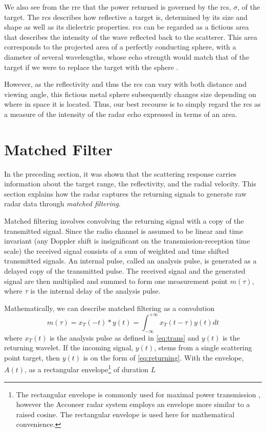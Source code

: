 We also see from the \gls{rre} that the power returned is governed by the \gls{rcs}, $\sigma$, of the target. The \gls{rcs} describes how reflective a target is, determined by its size and shape as well as its dielectric properties. \gls{rcs} can be regarded as a fictious area that describes the intensity of the wave reflected back to the scatterer. This area corresponds to the projected area of a perfectly conducting sphere, with a diameter of several wavelengths, whose echo strength would match that of the target if we were to replace the target with the sphere \citep{knott_1993}. 

However, as the reflectivity and thus the \gls{rcs} can vary with both distance and viewing angle, this fictious metal sphere subsequently changes size depending on where in space it is located. Thus, our best recourse is to simply regard the \gls{rcs} as a measure of the intensity of the radar echo expressed in terms of an area. 

\section{Matched Filter}\label{sec:mf}

In the preceding section, it was shown that the scattering response carries information about the target range, the reflectivity, and the radial velocity. This section explains how the radar captures the returning signals to generate raw radar data through \emph{matched filtering}.

Matched filtering involves convolving the returning signal with a copy of the transmitted signal. Since the radio channel is assumed to be linear and time invariant (any Doppler shift is insignificant on the transmission-reception time scale) the received signal consists of a sum of weighted and time shifted transmitted signals. An internal pulse, called an analysis pulse, is generated as a delayed copy of the transmitted pulse. The received signal and the generated signal are then multiplied and summed to form one measurement point $m(\tau)$, where $\tau$ is the internal delay of the analysis pulse. 

Mathematically, we can describe matched filtering as a convolution
\begin{equation}
	m(\tau) 
	= x_T(-t) * y(t)
	= \int_{-\infty}^{+\infty} x_T(t - \tau)y(t) dt
\end{equation}
where $x_T(t)$ is the analysis pulse as defined in \eqref{eq:trans} and $y(t)$ is the returning wavelet. If the incoming signal, $y(t)$, stems from a single scattering point target, then $y(t)$ is on the form of \eqref{eq:returning}. With the envelope, $A(t)$, as a rectangular envelope\footnote{The rectangular envelope is commonly used for maximal power transmission \citep{richards_2014}, however the Acconeer radar system employs an envelope more similar to a raised cosine. The rectangular envelope is used here for mathematical convenience.} of duration $L$

